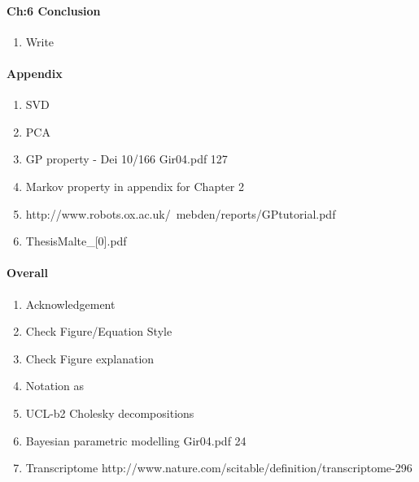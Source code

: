 \documentclass[a4paper,10pt]{article}
\begin{document}
\paragraph{Ch:6 Conclusion}
\begin{enumerate}
 \item Write
\end{enumerate}

\paragraph{Appendix}
\begin{enumerate}
 \item SVD %
 \item PCA
 \item GP property - Dei 10/166  Gir04.pdf 127  %
 \item Markov property in appendix for Chapter 2 %
 \item http://www.robots.ox.ac.uk/~mebden/reports/GPtutorial.pdf
 \item ThesisMalte\_[0].pdf %
\end{enumerate}



\paragraph{Overall}
\begin{enumerate}
 \item Acknowledgement %
 \item Check Figure/Equation Style
 \item Check Figure explanation
 \item Notation as  %
 \item UCL-b2 Cholesky decompositions %
 \item Bayesian parametric modelling Gir04.pdf 24 %
 \item Transcriptome http://www.nature.com/scitable/definition/transcriptome-296
\end{enumerate}
\end{document}
